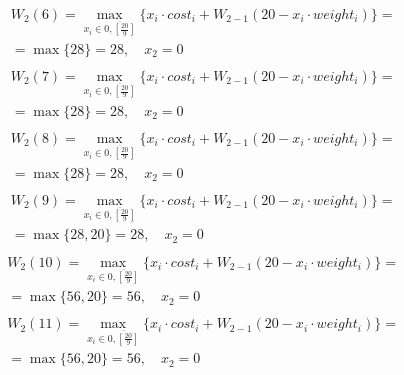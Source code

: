\documentclass[17pt]{extarticle}
\begin{document}
\[
    \begin{aligned}
         & W_2(6)=\max_{x_i \in \overline{0, \left[\frac{20}{9}\right]}} \{x_i \cdot cost_i + W_{2-1}(20 - x_i \cdot weight_i)\}= \\& = \max \{
        28\}= 28, \quad x_2 = 0                                                                                                   \\
    \end{aligned}
\]
\[
    \begin{aligned}
         & W_2(7)=\max_{x_i \in \overline{0, \left[\frac{20}{9}\right]}} \{x_i \cdot cost_i + W_{2-1}(20 - x_i \cdot weight_i)\}= \\& = \max \{
        28\}= 28, \quad x_2 = 0                                                                                                   \\
    \end{aligned}
\]
\[
    \begin{aligned}
         & W_2(8)=\max_{x_i \in \overline{0, \left[\frac{20}{9}\right]}} \{x_i \cdot cost_i + W_{2-1}(20 - x_i \cdot weight_i)\}= \\& = \max \{
        28\}= 28, \quad x_2 = 0                                                                                                   \\
    \end{aligned}
\]
\[
    \begin{aligned}
         & W_2(9)=\max_{x_i \in \overline{0, \left[\frac{20}{9}\right]}} \{x_i \cdot cost_i + W_{2-1}(20 - x_i \cdot weight_i)\}= \\& = \max \{
        28, 20\}= 28, \quad x_2 = 0                                                                                               \\
    \end{aligned}
\]
\[
    \begin{aligned}
         & W_2(10)=\max_{x_i \in \overline{0, \left[\frac{20}{9}\right]}} \{x_i \cdot cost_i + W_{2-1}(20 - x_i \cdot weight_i)\}= \\& = \max \{
        56, 20\}= 56, \quad x_2 = 0                                                                                                \\
    \end{aligned}
\]
\[
    \begin{aligned}
         & W_2(11)=\max_{x_i \in \overline{0, \left[\frac{20}{9}\right]}} \{x_i \cdot cost_i + W_{2-1}(20 - x_i \cdot weight_i)\}= \\& = \max \{
        56, 20\}= 56, \quad x_2 = 0                                                                                                \\
    \end{aligned}
\]
\end{document}
